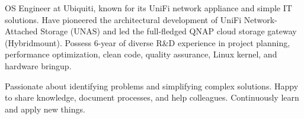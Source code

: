 

\begin{cvparagraph}

OS Engineer at Ubiquiti, known for its UniFi network appliance and simple IT
solutions. Have pioneered the architectural development of UniFi
Network-Attached Storage (UNAS) and led the full-fledged QNAP cloud storage
gateway (Hybridmount). Possess 6-year of diverse R\&D experience in project
planning, performance optimization, clean code, quality assurance, Linux kernel,
and hardware bringup.

Passionate about identifying problems and simplifying complex solutions.
Happy to share knowledge, document processes, and help colleagues.
Continuously learn and apply new things.
%
%

\end{cvparagraph}
